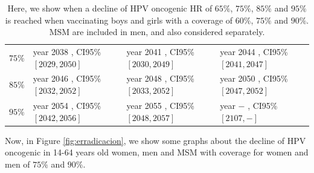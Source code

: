 \begin{table}[!h]
\begin{tabular}{c|lll}
$ 75 \%$ & year  2038 , CI95\% $[ 2029 , 2050 ]$ & year  2041 , CI95\% $[ 2030 , 2049 ]$ & year  2044 , CI95\% $[ 2041 , 2047 ]$ \\
$ 85 \%$ & year  2046 , CI95\% $[ 2032 , 2052 ]$ & year  2048 , CI95\% $[ 2033 , 2052 ]$ & year  2050 , CI95\% $[ 2047 , 2052 ]$ \\
$ 95 \%$ & year  2054 , CI95\% $[ 2042 , 2056 ]$ & year  2055 , CI95\% $[ 2048 , 2057 ]$ & year  $-$ , CI95\% $[ 2107 , - ]$
	\end{tabular} 
	\caption{Here, we show when a decline of HPV oncogenic HR of $65\%$, $75\%$, $85\%$ and $95\%$ is reached when vaccinating boys and girls with a coverage of $60\%$, $75\%$ and $90\%$. MSM are included in men, and also considered separately.}
	\label{tabla:decline_HR_onco}
\end{table}

Now, in Figure \ref{fig:erradicacion}, we show some graphs about the decline of HPV oncogenic in 14-64 years old women, men and MSM with coverage for women and men of $75\%$ and $90\%$.

